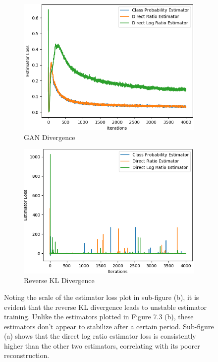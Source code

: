 \documentclass[honours,12pt, twoside]{unswthesis}
\numberwithin{equation}{section}
\theoremstyle{definition}
\begin{document}
\begin{figure}[h!]
\centering
\begin{subfigure}{0.49\textwidth}
\includegraphics[width=\linewidth]{part3estimatorlosses/PCADVvsPCADVexpvsPCADVgudlog.png}
\caption{GAN Divergence}
\end{subfigure}
\begin{subfigure}{0.49\textwidth}
\includegraphics[width=\linewidth]{part3estimatorlosses/PCKLDvsPCKLexpvsPCKLgudlog.png}
\caption{Reverse KL Divergence}
\end{subfigure}
\caption{\small Noting the scale of the estimator loss plot in sub-figure (b), it is evident that the reverse KL divergence leads to unstable estimator training. Unlike the estimators plotted in Figure 7.3 (b), these estimators don't appear to stabilize after a certain period. Sub-figure (a) shows that the direct log ratio estimator loss is consistently higher than the other two estimators, correlating with its poorer reconstruction.}
\end{figure}
\end{document}
